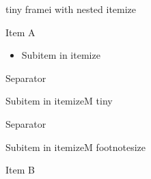 \documentclass[11pt,compress,t,notes=noshow, xcolor=table]{beamer}
\begin{document}
\begin{framei}[fs=tiny]{tiny framei with nested itemize}
  \item Item A
  \begin{itemize}
    \item Subitem in itemize
  \end{itemize}
  \item Separator
  \begin{itemizeM}[tiny]
    \item Subitem in itemizeM tiny
  \end{itemizeM}
  \item Separator
  \begin{itemizeM}[footnotesize]
    \item Subitem in itemizeM footnotesize
  \end{itemizeM}
  \item Item B
\end{framei}

\endlecture
\end{document}
